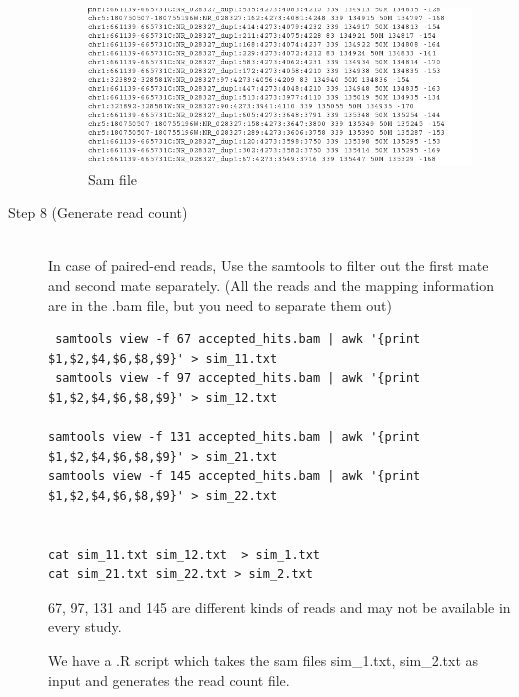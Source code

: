 \documentclass{article}
\begin{document}
\begin{description}
\begin{figure}[htpb]
\begin{center} 
\includegraphics[scale=0.4]{sam.png}
\end{center}
\caption{ Sam file}
\label{fig:sam}
\end{figure}

\item[Step 8 (Generate read count)] \hfill \\

In case of paired-end reads,
Use the samtools to filter out the first mate and second mate separately. (All the reads and the mapping information are in the .bam file, but you need to separate them out)

\begin{verbatim} 
 samtools view -f 67 accepted_hits.bam | awk '{print $1,$2,$4,$6,$8,$9}' > sim_11.txt
 samtools view -f 97 accepted_hits.bam | awk '{print $1,$2,$4,$6,$8,$9}' > sim_12.txt
 
samtools view -f 131 accepted_hits.bam | awk '{print $1,$2,$4,$6,$8,$9}' > sim_21.txt
samtools view -f 145 accepted_hits.bam | awk '{print $1,$2,$4,$6,$8,$9}' > sim_22.txt


cat sim_11.txt sim_12.txt  > sim_1.txt
cat sim_21.txt sim_22.txt > sim_2.txt
\end{verbatim}

67, 97, 131 and 145 are different kinds of reads and may not be available in every study.

We have a .R script which takes the sam files sim\_1.txt, sim\_2.txt as input and generates the read count file.

\end{description}
\end{document}
